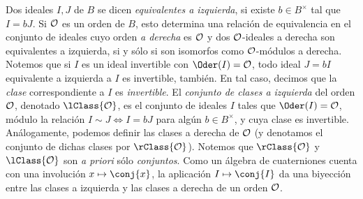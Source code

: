 
Dos ideales $I,J$ de $B$ se dicen \emph{equivalentes a izquierda},
si existe $b\in B^{\times}$ tal que $I=bJ$.
Si $\cal{O}$ es un orden de $B$, esto determina una relaci\'{o}n de
equivalencia en el conjunto de ideales cuyo orden \emph{a derecha} es
$\cal{O}$ y dos $\cal{O}$-ideales a derecha son equivalentes a izquierda,
si y s\'{o}lo si son isomorfos como $\cal{O}$-m\'{o}dulos a derecha.
Notemos que si $I$ es un ideal invertible con $\Oder(I)=\cal{O}$, todo
ideal $J=bI$ equivalente a izquierda a $I$ es invertible, tambi\'{e}n.
En tal caso, decimos que la \emph{clase} correspondiente a $I$ es
\emph{invertible}.
El \emph{conjunto de clases a izquierda}
del orden $\cal{O}$, denotado $\lClass{\cal{O}}$, es el conjunto de
ideales $I$ tales que $\Oder(I)=\cal{O}$, m\'{o}dulo la relaci\'{o}n
$I\sim J\Leftrightarrow I=bJ$ para alg\'{u}n $b\in B^{\times}$, y cuya clase
es invertible. An\'{a}logamente, podemos definir las clases a derecha de
$\cal{O}$ (y denotamos el conjunto de dichas clases por $\rClass{\cal{O}}$).
Notemos que $\rClass{\cal{O}}$ y $\lClass{\cal{O}}$ son \emph{a priori}
s\'{o}lo \emph{conjuntos}.
Como un \'{a}lgebra de cuaterniones cuenta con una involuci\'{o}n
$x\mapsto\conj{x}$, la aplicaci\'{o}n $I\mapsto\conj{I}$ da una biyecci\'{o}n
entre las clases a izquierda y las clases a derecha de un orden $\cal{O}$.


